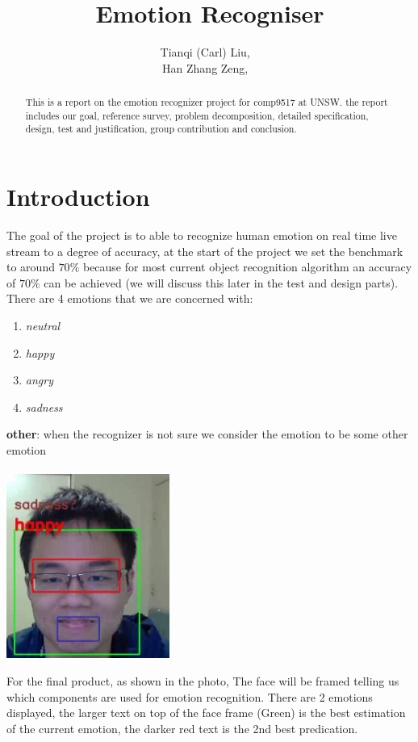 \documentclass[11pt,journal]{IEEEtran}
\title{Emotion Recogniser}
\author{Tianqi (Carl) Liu, ~\IEEEmembership{z5019791} \\
        Han Zhang Zeng, ~\IEEEmembership{z1234567}}
\begin{document}
\maketitle
\begin{abstract}
    This is a report on the emotion recognizer project for comp9517 at UNSW. the report includes our goal, reference survey, problem decomposition, detailed specification, design, test and justification, group contribution and conclusion.
\end{abstract}

\section{Introduction}
  The goal of the project is to able to recognize human emotion on real time live stream to a degree of accuracy, at the start of the project we set the benchmark to around $70\%$ because for most current object recognition algorithm an accuracy of $70\%$ can be achieved (we will discuss this later in the test and design parts). There are 4 emotions that we are concerned with:

  \begin{enumerate}
    \item \textit{neutral}
    \item \textit{happy}
    \item \textit{angry}
    \item \textit{sadness}
  \end{enumerate}

  \textbf{other}: when the recognizer is not sure we consider the emotion to be some other emotion\\\\

  \includegraphics[width=0.4\textwidth]{01.png}

  For the final product, as shown in the photo, The face will be framed telling us which components are used for emotion recognition. There are 2 emotions displayed, the larger text on top of the face frame (Green) is the best estimation of the current emotion, the darker red text is the 2nd best predication.
\end{document}
